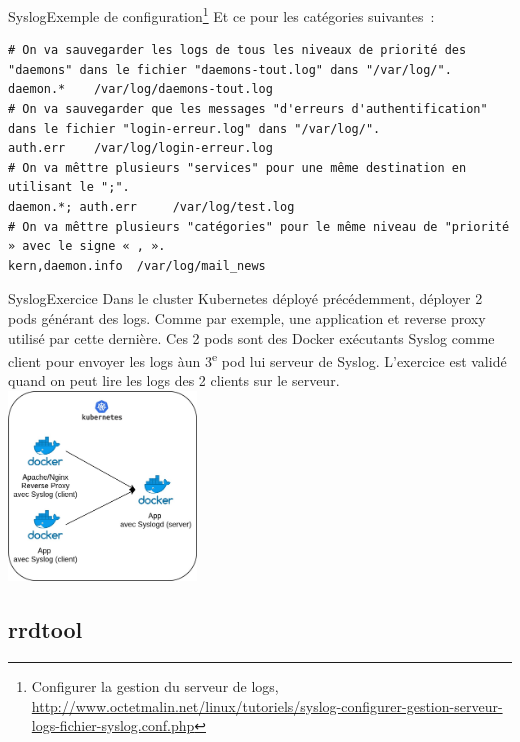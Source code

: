 \documentclass{beamer}
\begin{document}
    \begin{frame}[fragile]{Syslog}{Exemple de configuration\footnote{Configurer la gestion du serveur de logs, \url{http://www.octetmalin.net/linux/tutoriels/syslog-configurer-gestion-serveur-logs-fichier-syslog.conf.php}}}
        Et ce pour les catégories suivantes~:
        \begin{lstlisting}
# On va sauvegarder les logs de tous les niveaux de priorité des "daemons" dans le fichier "daemons-tout.log" dans "/var/log/".
daemon.*	/var/log/daemons-tout.log
# On va sauvegarder que les messages "d'erreurs d'authentification" dans le fichier "login-erreur.log" dans "/var/log/".
auth.err	/var/log/login-erreur.log
# On va mêttre plusieurs "services" pour une même destination en utilisant le ";".
daemon.*; auth.err     /var/log/test.log
# On va mêttre plusieurs "catégories" pour le même niveau de "priorité » avec le signe « , ».
kern,daemon.info  /var/log/mail_news
        \end{lstlisting}
    \end{frame}

    \begin{frame}{Syslog}{Exercice \execcounterdispinc{}}
        Dans le cluster Kubernetes déployé précédemment, déployer 2 pods générant des logs.
        Comme par exemple, une application et reverse proxy utilisé par cette dernière.
        Ces 2 pods sont des Docker exécutants Syslog comme client pour envoyer les logs àun 3\textsuperscript{e} pod lui serveur de Syslog.
        L'exercice est validé quand on peut lire les logs des 2 clients sur le serveur.
        \bigbreak
        \centering
        \includegraphics[width=5cm]{image/syslog-exercice}
    \end{frame}

    \subsection{rrdtool}\label{subsec:rrdtool}
\end{document}
